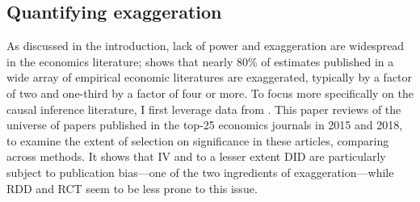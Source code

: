 \documentclass[usletter, 12pt]{article}
\begin{document}
		 
	                \subsection{Quantifying exaggeration}
	                
	                	 	As discussed in the introduction, lack of power and exaggeration are widespread in the economics literature; \cite{ioannidis_power_2017} shows that nearly 80\% of estimates published in a wide array of empirical economic literatures are exaggerated, typically by a factor of two and one-third by a factor of four or more. To focus more specifically on the causal inference literature, I first leverage data from \cite{brodeur_methods_2020}. This paper reviews of the universe of papers published in the top-25 economics journals in 2015 and 2018, to examine the extent of selection on significance in these articles, comparing across methods. It shows that IV and to a lesser extent DID are particularly subject to publication bias---one of the two ingredients of exaggeration---while RDD and RCT seem to be less prone to this issue.
			
\end{document}
